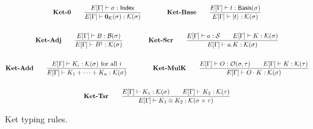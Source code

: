 \documentclass{article}
\begin{document}
\begin{figure}[h]
    \begin{gather*}
        \textbf{Ket-0} \qquad
        \frac{E[\Gamma] \vdash \sigma : \mathsf{Index}}{E[\Gamma] \vdash \mathbf{0}_\mathcal{K}(\sigma) : \mathcal{K}(\sigma)} 
        \qquad \qquad
        \textbf{Ket-Base} \qquad
        \frac{E[\Gamma]\vdash t : \mathsf{Basis}(\sigma)}{E[\Gamma] \vdash \ket{t} : \mathcal{K}(\sigma)} \\
        \\
        \textbf{Ket-Adj} \qquad
        \frac{E[\Gamma] \vdash B : \mathcal{B}(\sigma)}{E[\Gamma] \vdash B^\dagger : \mathcal{K}(\sigma)} 
        \qquad \qquad
        \textbf{Ket-Scr} \qquad
        \frac{E[\Gamma] \vdash a : \mathcal{S} \qquad E[\Gamma] \vdash K : \mathcal{K}(\sigma)}{E[\Gamma] \vdash a.K : \mathcal{K}(\sigma)} \\
        \\
        \textbf{Ket-Add} \qquad
        \frac{E[\Gamma] \vdash K_i : \mathcal{K}(\sigma) \text{ for all $i$}}{E[\Gamma] \vdash K_1 + \cdots + K_n : \mathcal{K}(\sigma)}
        \qquad \qquad
        \textbf{Ket-MulK} \qquad
        \frac{E[\Gamma] \vdash O : \mathcal{O}(\sigma, \tau) \qquad E[\Gamma] \vdash K : \mathcal{K}(\tau)}{E[\Gamma] \vdash O \cdot K : \mathcal{K}(\sigma)} \\
        \\
        \textbf{Ket-Tsr} \qquad
        \frac{E[\Gamma] \vdash K_1 : \mathcal{K}(\sigma) \qquad E[\Gamma] \vdash K_2 : \mathcal{K}(\tau)} {E[\Gamma] \vdash K_1 \otimes K_2 : \mathcal{K}(\sigma \times \tau)}
    \end{gather*}
    \caption{Ket typing rules.}
\end{figure}
\end{document}
